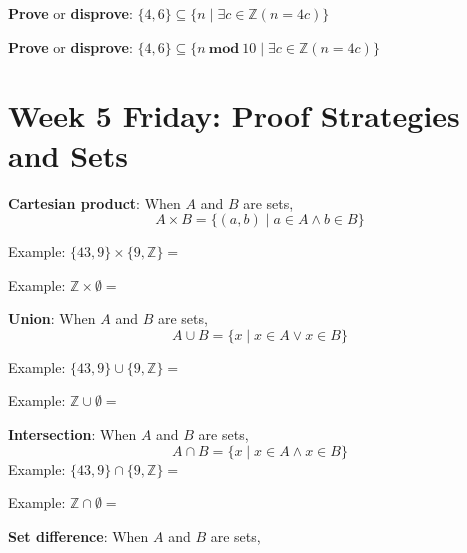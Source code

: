 \documentclass[12pt, oneside]{article}
\begin{document}
{\bf Prove} or {\bf  disprove}: $\{ 4, 6 \} \subseteq \{ n \mid  \exists c \in \mathbb{Z} ( n = 4c) \} $

\vspace{150pt}

{\bf Prove} or {\bf  disprove}: $\{ 4, 6 \} \subseteq \{ n ~\textbf{mod}~10 \mid  \exists c \in \mathbb{Z} ( n = 4c) \} $

\vspace{150pt}

 \vfill


\newpage
\section*{Week 5 Friday: Proof Strategies and Sets}


{\bf Cartesian product}: When $A$ and  $B$ are sets, 
\[
    A \times  B = \{ (a,b) \mid a \in A  \wedge b  \in B \}
\]

Example: $\{43, 9\} \times  \{9, \mathbb{Z}\}  = $
    
Example: $\mathbb{Z} \times \emptyset  = $

{\bf Union}: When $A$ and  $B$ are sets,
\[
    A \cup  B = \{ x \mid x \in A  \vee x \in B \}
\]    
    
Example: $\{43, 9\} \cup \{9, \mathbb{Z}\}  = $

Example: $\mathbb{Z} \cup \emptyset  = $ 

{\bf Intersection}: When $A$ and  $B$ are sets,
\[
    A \cap  B = \{ x \mid x \in A  \wedge x \in B \}
\]    
Example: $\{43, 9\} \cap \{9,\mathbb{Z}\}  = $

Example: $\mathbb{Z} \cap \emptyset  = $


{\bf Set  difference}: When $A$ and  $B$ are sets,
\end{document}
